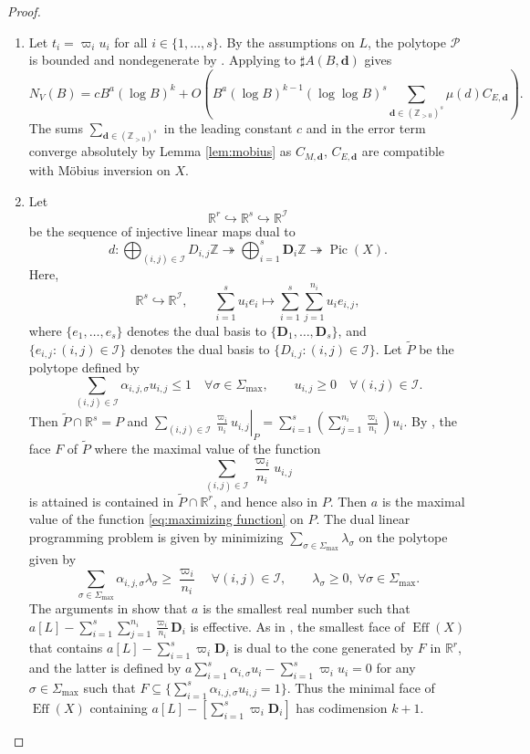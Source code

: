 \documentclass[10pt, a4paper, reqno, english]{amsart}
\newcommand\ZZ{\mathbb{Z}}
\newcommand\RR{\mathbb{R}}
\newcommand{\indexset}{{\mathcal I}} %
\newcommand{\divclass}{{\mathbf D}} %
\DeclareMathOperator{\pic}{Pic} %
\DeclareMathOperator{\eff}{Eff} %
\theoremstyle{definition}
\numberwithin{theorem}{section}
\numberwithin{equation}{section}
\begin{document}
\begin{proof}
\begin{enumerate}[label=(\roman*), ref=(\roman*)]
\item
Let $t_i=\varpi_iu_i$ for all $i\in\{1,\dots,s\}$. By the assumptions on $L$, the polytope $\mathcal P$ is bounded and nondegenerate by \cite[Remark 6.2]{hypmethod}. 
Applying \cite[Theorem 1.1]{hypmethod} to $\sharp A(B,\mathbf d)$ gives
$$
N_V(B)=c B^a(\log B)^k + O\left(B^a(\log B)^{k-1}(\log\log B)^s \sum_{\mathbf d\in(\ZZ_{>0})^{s}}\mu(d) C_{E,\mathbf d} \right).
$$
The sums $\sum_{\mathbf d\in(\ZZ_{>0})^{s}}$ in the leading constant $c$ and in the error term converge absolutely by Lemma \ref{lem:mobius} as $C_{M,\mathbf d}$, $C_{E,\mathbf d}$ are compatible with M\"obius inversion on $X$.

\item Let 
	 $$
	 \RR^r\hookrightarrow\RR^s\hookrightarrow\RR^{\indexset}
	 $$
	 be the sequence of injective linear maps dual to 
	 $$d:\bigoplus_{(i,j)\in\indexset}D_{i,j}\ZZ\twoheadrightarrow\bigoplus_{i=1}^s\divclass_i\ZZ\twoheadrightarrow\pic(X).	$$
	 Here, $$\RR^s\hookrightarrow\RR^{\indexset}, \qquad \sum_{i=1}^s u_ie_i\mapsto\sum_{i=1}^s\sum_{j=1}^{n_i}u_ie_{i,j},$$ where $\{e_1,\dots,e_s\}$ denotes the dual basis to $\{\divclass_1,\dots,\divclass_s\}$, and $\{e_{i,j}:(i,j)\in\indexset\}$ denotes the dual basis to $\{D_{i,j}:(i,j)\in\indexset\}$.
	 Let $\widetilde P$ be the polytope defined by 
	 $$
	  \sum_{(i,j)\in\indexset}\alpha_{i,j,\sigma}u_{i,j}\leq 1 \quad \forall \sigma\in\Sigma_{\max}, \qquad u_{i,j}\geq 0 \quad \forall (i,j)\in\indexset.
	 $$
	 Then $\widetilde P\cap \RR^s=P$ and $\left.\sum_{(i,j)\in\indexset}\frac{\varpi_i}{n_i}u_{i,j}\right|_{P}=\sum_{i=1}^s\left(\sum_{j=1}^{n_i}\frac{\varpi_i}{n_i}\right)u_i$. 
	 By \cite[Lemma 6.7]{hypmethod}, the face $F$ of $\widetilde P$ where the maximal value of the function
	  \begin{equation}
	 \sum_{(i,j)\in\indexset}\frac{\varpi_i}{n_i}u_{i,j} \label{eq:maximizing function}
	 \end{equation}
	 is attained is contained in $\widetilde P\cap \RR^r$, and hence also in $P$.
	 Then $a$ is the maximal value of the function \eqref{eq:maximizing function} on $P$. The dual linear programming problem is given by minimizing $\sum_{\sigma\in\Sigma_{\max}}\lambda_\sigma$ on the polytope given by
	 $$
	 \sum_{\sigma\in\Sigma_{\max}}\alpha_{i,j,\sigma}\lambda_\sigma\geq \frac{\varpi_i}{n_i} \quad \forall (i,j)\in\indexset, \qquad \lambda_\sigma\geq 0,\ \forall \sigma\in\Sigma_{\max}.
	 $$
	 The arguments in \cite[\S 6.5.1]{hypmethod} show that
	  $a$ is the smallest real number such that $a[L]-\sum_{i=1}^s\sum_{j=1}^{n_i}\frac{\varpi_i}{n_i}\divclass_i$ is effective. 
	  As in \cite[Proposition 6.13]{hypmethod}, the smallest face of $\eff(X)$ that contains $a[L]-\sum_{i=1}^s\varpi_i\divclass_i$ is dual to the cone generated by $F$ in $\RR^r$, and the latter is defined by $a\sum_{i=1}^s\alpha_{i,\sigma}u_i-\sum_{i=1}^s\varpi_iu_i=0$ for any $\sigma\in\Sigma_{\max}$ such that $F\subseteq \{\sum_{i=1}^s\alpha_{i,j,\sigma}u_{i,j}=1\}$.
	  Thus the minimal face of $\eff(X)$ containing $a[L]-[\sum_{i=1}^s\varpi_i\divclass_i]$ has codimension $k+1$.


\end{enumerate}
\end{proof}
\end{document}
